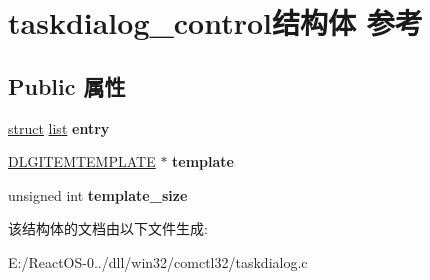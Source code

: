 \hypertarget{structtaskdialog__control}{}\section{taskdialog\+\_\+control结构体 参考}
\label{structtaskdialog__control}
\subsection*{Public 属性}
\begin{DoxyCompactItemize}
\item 
\mbox{\label{structtaskdialog__control_a1eae45b72aba1b67bfd33cf2fd554871}} 
\hyperlink{interfacestruct}{struct} \hyperlink{classlist}{list} {\bfseries entry}
\item 
\mbox{\label{structtaskdialog__control_abb6d2286facb8a9b91ba48db4e821369}} 
\hyperlink{struct_d_l_g_i_t_e_m_t_e_m_p_l_a_t_e}{D\+L\+G\+I\+T\+E\+M\+T\+E\+M\+P\+L\+A\+TE} $\ast$ {\bfseries template}
\item 
\mbox{\label{structtaskdialog__control_aefb564034943728879d560c47cf92b49}} 
unsigned int {\bfseries template\+\_\+size}
\end{DoxyCompactItemize}


该结构体的文档由以下文件生成\+:\begin{DoxyCompactItemize}
\item 
E\+:/\+React\+O\+S-\/0../dll/win32/comctl32/taskdialog.\+c\end{DoxyCompactItemize}
